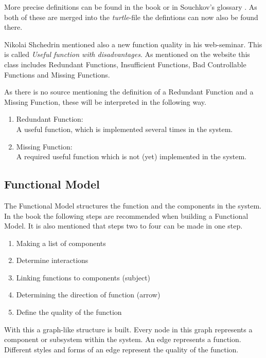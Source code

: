 \documentclass[11pt,a4paper]{article}
\begin{document}
More precise definitions can be found in the book \cite{KS} or in Souchkov's
glossary \cite{SouchkovGlossary}.  As both of these are merged into the
\emph{turtle}-file the defintions can now also be found there.

Nikolai Shchedrin mentioned also a new function quality in his web-seminar.
This is called \emph{Useful function with disadvantages}.  As mentioned on the
website \cite{ShchedrinUsefulFunctionDisadvantage} this class includes
Redundant Functions, Insufficient Functions, Bad Controllable Functions and
Missing Functions.

As there is no source mentioning the definition of a Redundant Function and a
Missing Function, these will be interpreted in the following way.
\begin{enumerate}
\item Redundant Function: \\
  A useful function, which is implemented several times in the system.
\item Missing Function: \\
  A required useful function which is not (yet) implemented in the system.
\end{enumerate}

\subsection{Functional Model}
\label{subsec:functional_model}

The Functional Model structures the function and the components in the system.
In the book the following steps are recommended when building a Functional
Model.  It is also mentioned that steps two to four can be made in one step.
\begin{enumerate}
\item Making a list of components
\item Determine interactions
\item Linking functions to components (subject)
\item Determining the direction of function (arrow)
\item Define the quality of the function
\end{enumerate}

With this a graph-like structure is built.  Every node in this graph
represents a component or subsystem within the system.  An edge represents a
function.  Different styles and forms of an edge represent the quality of the
function.
\end{document}

